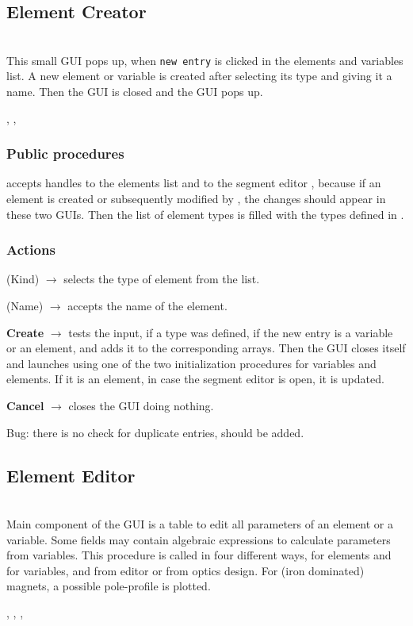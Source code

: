 \documentclass[12pt]{article}
\newcommand\code[1]{{\tt #1}}
\newcommand{\ofld}[1]{\colorbox{black!15}{{{\color{black}\bf #1}}}}
\newcommand{\ofldx}[1]{\colorbox{black!15}{{\color{black}(#1)}}}
\newcommand\guico[1]{{\color{blue}\code{#1}}}
\newcommand{\evcod}[2]{\ofld{#1} $\rightarrow$ \guico{#2}}
\newcommand{\evcodx}[2]{\ofldx{#1} $\rightarrow$ \guico{#2}}
\newcommand{\opagui}[1]{\colorbox{blue!20}{{\color{black}\code{#1}}}}
\newcommand{\oguih}[2]{\subsection{\label{#2}#1}{\Huge\opagui{#2}}\\}
\newcommand{\ogui}[1]{\hyperref[#1]{\opagui{#1}}}
\newcommand{\opaguif}[1]{\colorbox{violet!30}{{\color{black}\code{#1}}}}
\newcommand{\oguif}[1]{\hyperref[#1]{\opaguif{#1}}}
\newcommand{\opauni}[1]{\colorbox{orange!30}{{\color{black}\code{#1}}}}
\newcommand{\ouni}[1]{\hyperref[#1]{\opauni{#1}}}
\newcommand{\uses}[1]{\flushleft {\bf Uses:} #1}
\newcommand{\desc}[1]{#1}
\newcommand{\act}[1]{\subsubsection*{Actions} #1}
\newcommand{\ppro}[1]{\subsubsection*{Public procedures} #1}
\newcommand{\todo}[1]{{\color{red} #1}}
\begin{document}
\oguih{Element Creator}{oelecreate} 

\desc{This small GUI pops up, when \code{new entry} is clicked in the \ouni{opaeditor} elements and variables list. A new element or variable is created after selecting its type and giving it a name. Then the GUI is closed and the \ogui{oeleedit} GUI pops up.}

\uses{\ouni{globlib}, \ogui{oeleedit}, \ogui{osegedit} }   
\ppro{
\guico{Init} accepts handles to the \ogui{opaeditor} elements list and to the segment editor \ouni{osegedit}, because if an element is created or subsequently modified by \ogui{oeleedit}, the changes should appear in these two GUIs. Then the list of element types is filled with the types defined in \ouni{globlib}.
}

\act{
\evcodx{Kind}{ComETypeChange} selects the type of element from the list.

\evcodx{Name}{EdENameChange} accepts the name of the element.

\evcod{Create}{ButCreClick} tests the input, if a type was defined, if the new entry is a variable or an element, and adds it to the corresponding arrays. Then the GUI closes itself and launches \ogui{oeleedit} using one of the two initialization procedures for variables and elements. If it is an element, in case  the segment editor \ogui{osegedit} is open, it is updated.

\evcod{Cancel}{ButCanClick} closes the GUI doing nothing.
}

\todo{Bug: there is no check for duplicate entries, should be added.}


\oguih{Element Editor}{oeleedit} 

\desc{
Main component of the GUI is a table to edit all parameters of an element or a variable. Some fields may contain algebraic expressions to calculate parameters from variables. This procedure is called in four different ways, for elements and for variables, and from editor or from optics design. For (iron dominated) magnets, a possible pole-profile is plotted.
}

\uses{\ouni{globlib}, \ouni{linoplib}, \oguif{../com/asfigure}, \ouni{../com/asaux}}
\end{document}
